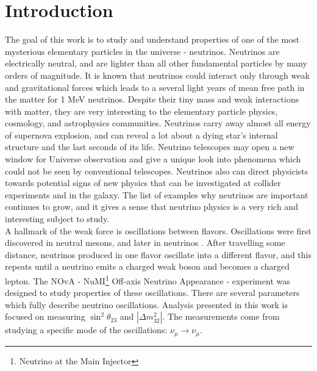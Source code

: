 \chapter{Introduction}
\label{intro_chapter}

The goal of this work is to study and understand properties of one of the most 
mysterious elementary particles in the universe - neutrinos. Neutrinos are electrically
neutral, and are lighter than all other fundamental particles by many orders of magnitude.
It is known that neutrinos could interact only through weak and 
gravitational forces which leads to a several light years of mean free path in 
the matter for 1 MeV neutrinos. Despite their tiny mass and weak interactions
with matter, they are very interesting to the elementary particle physics, cosmology, and
astrophysics communities. Neutrinos carry away almost all energy of supernova 
explosion, and can reveal a lot about a dying star's internal structure and the last 
seconds of its life. Neutrino telescopes may open a new window for Universe observation 
and give a unique look into phenomena which could not be seen by conventional 
telescopes. Neutrinos also can direct physicists
towards potential signs of new physics that can be investigated at collider experiments
\cite{seeSawAndParityViolation} and in the galaxy. The list of examples why neutrinos are 
important continues to grow, and it gives a sense that neutrino physics is a 
very rich and interesting subject to study.\\

A hallmark of the weak force is oscillations between flavors.  Oscillations were first
discovered in neutral mesons, and later in neutrinos \cite{kamiokandeTwo, solarNuSummary,
dayaBayResults, NOvAresults, mainzPhaseIIResults, t2kResults}. After travelling some
distance, neutrinos produced in one flavor oscillate into a different flavor, and this repeats
until a neutrino emits a charged weak boson and becomes a charged lepton. The NOvA - 
NuMI\footnote{Neutrino at the Main Injector} Off-axis Neutrino Appearance - experiment
was designed to study properties of these oscillations. There are several
parameters which fully describe neutrino oscillations. Analysis presented in this work 
is focused on measuring $\sin^2\theta_{23}$ and $|\Delta m^2_{32}|$. The measurements 
come from studying a specific mode of the oscillations: $\nu_\mu \rightarrow \nu_\mu$.\\

